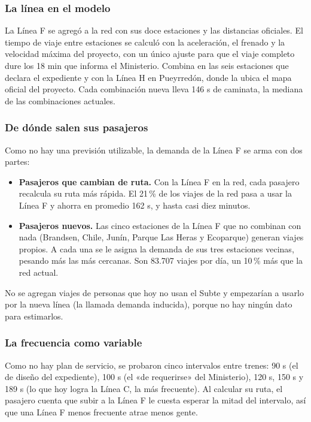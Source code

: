 \documentclass{article}
\begin{document}
\subsubsection{La línea en el modelo}

La Línea F se agregó a la red con sus doce estaciones y las distancias oficiales. El tiempo de viaje entre
estaciones se calculó con la aceleración, el frenado y la velocidad máxima del proyecto, con un único ajuste
para que el viaje completo dure los 18 min que informa el Ministerio. Combina en las seis estaciones que
declara el expediente y con la Línea H en Pueyrredón, donde la ubica el mapa oficial del proyecto. Cada
combinación nueva lleva 146 s de caminata, la mediana de las combinaciones actuales.

\subsubsection{De dónde salen sus pasajeros}

Como no hay una previsión utilizable, la demanda de la Línea F se arma con dos partes:
\begin{itemize}
  \item \textbf{Pasajeros que cambian de ruta.} Con la Línea F en la red, cada pasajero recalcula su ruta
    más rápida. El 21\,\% de los viajes de la red pasa a usar la Línea F y ahorra en promedio 162 s, y hasta
    casi diez minutos.
  \item \textbf{Pasajeros nuevos.} Las cinco estaciones de la Línea F que no combinan con nada (Brandsen,
    Chile, Junín, Parque Las Heras y Ecoparque) generan viajes propios. A cada una se le asigna la demanda de
    sus tres estaciones vecinas, pesando más las más cercanas. Son 83.707 viajes por día, un 10\,\% más que
    la red actual.
\end{itemize}
No se agregan viajes de personas que hoy no usan el Subte y empezarían a usarlo por la nueva línea (la
llamada demanda inducida), porque no hay ningún dato para estimarlos.

\subsubsection{La frecuencia como variable}

Como no hay plan de servicio, se probaron cinco intervalos entre trenes: 90 s (el de diseño del
expediente), 100 s (el «de requerirse» del Ministerio), 120 s, 150 s y 189 s (lo que hoy logra la Línea C,
la más frecuente). Al calcular su ruta, el pasajero cuenta que subir a la Línea F le cuesta esperar la mitad
del intervalo, así que una Línea F menos frecuente atrae menos gente.
\end{document}
